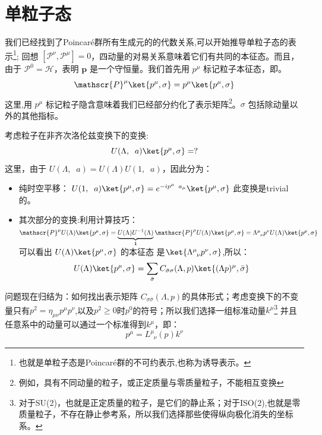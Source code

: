 \section{单粒子态}
我们已经找到了Poincar\'e群所有生成元的的代数关系,可以开始推导单粒子态的表示\footnote{也就是单粒子态是Poincar\'e群的不可约表示,也称为诱导表示。};
回想 \(\left[\mathscr{P}^\nu,\mathscr{P}^\mu\right]=0\)，四动量的对易关系意味着它们有共同的本征态。而且，由于 \(\mathscr{P}^0=\mathscr{H}\)，表明 \(\boldsymbol{p}\) 是一个守恒量。我们首先用 \(p^\mu\) 标记粒子本征态，即。
\begin{equation}\label{4.7}
    \mathscr{P}^\mu\ket{p^\mu,\sigma}=p^\mu\ket{p^\mu,\sigma}
\end{equation}
这里,用 \(p^\mu\) 标记粒子隐含意味着我们已经部分约化了表示矩阵\footnote{例如，具有不同动量的粒子，或正定质量与零质量粒子，不能相互变换}。\(\sigma\) 包括除动量以外的其他指标。
\par
\vspace{2ex}\noindent
考虑粒子在非齐次洛伦兹变换下的变换:
\[U(\Lambda,\;\;a)\ket{p^\mu,\sigma}=?\]
这里，由于 \(U(\Lambda,\;\;a)=U(\Lambda)U(1,\;\;a)\)，因此分为：
\begin{itemize}
    \item 纯时空平移：
    $U(1,\;\;a)\ket{p^\mu,\sigma}=e^{-ip^\mu\;\;a_\mu}\ket{p^\mu,\sigma}$
    此变换是trivial的。
    \item 其次部分的变换:利用计算技巧：$\mathscr{P}^\mu U(\Lambda)\ket{p^\mu,\sigma}=\underbrace{U(\Lambda)U^{-1}(\Lambda)}_{\mathbf{1}}\mathscr{P}^\mu U(\Lambda)\ket{p^\mu,\sigma}
    =\Lambda^\mu_{\;\;\nu}p^\nu U(\Lambda)\ket{p^\mu,\sigma}$
    可以看出 \(U(\Lambda)\ket{p^\mu,\sigma}\) 的本征态 是\(\ket{\Lambda^\mu_{\;\;\nu}p^\nu,\sigma}\),所以：
    \begin{equation}
        U(\Lambda)\ket{p^\mu,\sigma}=\sum_{\bar{\sigma}} C_{ \bar{\sigma}\sigma}(\Lambda,p)\ket{(\Lambda p)^\mu,\bar{\sigma}}
    \end{equation}
\end{itemize}
问题现在归结为：如何找出表示矩阵 \(C_{\sigma\bar{\sigma}}(\Lambda,p)\)的具体形式；考虑变换下的不变量只有$p^2=\eta_{\mu\nu}p^\mu p^\nu$,以及$p^2\geqslant0$时$p^0$的符号；所以我们选择一组标准动量${k^\mu}$\footnote{对于SU(2)，也就是正定质量的粒子，是它们的静止系；对于ISO(2),也就是零质量粒子，不存在静止参考系，所以我们选择那些使得纵向极化消失的坐标系。}
并且任意系中的动量可以通过一个标准得到${k^\mu}$，即：
\begin{equation}
    p^\mu=L^\mu_{\;\;\nu}(p)k^\nu
\end{equation}
